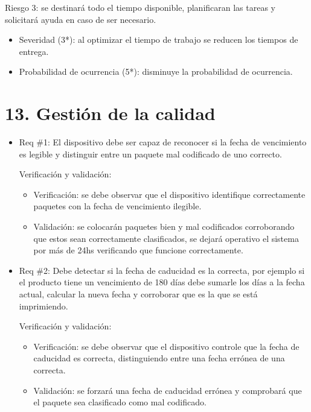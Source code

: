 \documentclass[11pt]{charter}
\begin{document}
Riesgo 3: se destinará todo el tiempo disponible, planificaran las tareas y solicitará ayuda en caso de ser necesario.

\begin{itemize}
\item Severidad (3*): al optimizar el tiempo de trabajo se reducen los tiempos de entrega.
\item Probabilidad de ocurrencia (5*): disminuye la probabilidad de ocurrencia.
\end{itemize}

\newpage
\section{13. Gestión de la calidad}
\label{sec:calidad}






\begin{itemize} 
\item Req \#1: El dispositivo debe ser capaz de reconocer si la fecha de vencimiento es legible y distinguir entre un paquete mal codificado de uno correcto.

Verificación y validación:

\begin{itemize}
\item Verificación: se debe observar que el dispositivo identifique correctamente paquetes con la fecha de vencimiento ilegible. 
\item Validación: se colocarán paquetes bien y mal codificados corroborando que estos sean correctamente clasificados, se dejará operativo el sistema por más de 24hs verificando que funcione correctamente.

\end{itemize}

\end{itemize}

\begin{itemize} 
\item Req \#2: Debe detectar si la fecha de caducidad es la correcta, por ejemplo si el producto tiene un vencimiento de 180 días debe sumarle los días a la fecha actual, calcular la nueva fecha y corroborar que es la que se está imprimiendo. 

Verificación y validación:

\begin{itemize}
\item Verificación: se debe observar que el dispositivo controle que la fecha de caducidad es correcta, distinguiendo entre una fecha errónea de una correcta.
\item Validación: se forzará una fecha de caducidad errónea y comprobará que el paquete sea clasificado como mal codificado.

\end{itemize}

\end{itemize}
\end{document}
